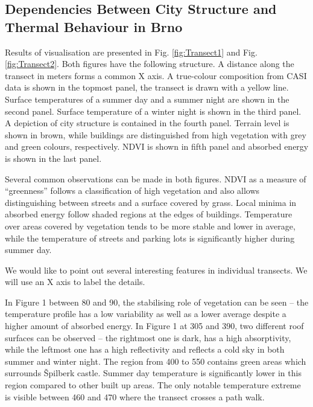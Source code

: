 \begin{appendices}

\chapter{Dependencies Between City Structure and Thermal Behaviour in Brno}
\label{app:Visualisation}

Results of visualisation are presented in Fig. \ref{fig:Transect1} and Fig. \ref{fig:Transect2}. Both figures have the following structure. A distance along the transect in meters forms a common X axis. A true-colour composition from CASI data is shown in the topmost panel, the transect is drawn with a yellow line. Surface temperatures of a summer day and a summer night are shown in the second panel. Surface temperature of a winter night is shown in the third panel. A depiction of city structure is contained in the fourth panel. Terrain level is shown in brown, while buildings are distinguished from high vegetation with grey and green colours, respectively. NDVI is shown in fifth panel and absorbed energy is shown in the last panel.

Several common observations can be made in both figures. NDVI as a measure of “greenness” follows a classification of high vegetation and also allows distinguishing between streets and a surface covered by grass. Local minima in absorbed energy follow shaded regions at the edges of buildings. Temperature over areas covered by vegetation tends to be more stable and lower in average, while the temperature of streets and parking lots is significantly higher during summer day.

We would like to point out several interesting features in individual transects. We will use an X axis to label the details.

In Figure 1 between 80 and 90, the stabilising role of vegetation can be seen – the temperature profile has a low variability as well as a lower average despite a higher amount of absorbed energy. In Figure 1 at 305 and 390, two different roof surfaces can be observed – the rightmost one is dark, has a high absorptivity, while the leftmost one has a high reflectivity and reflects a cold sky in both summer and winter night. The region from 400 to 550 contains green areas which surrounds Špilberk castle. Summer day temperature is significantly lower in this region compared to other built up areas. The only notable temperature extreme is visible between 460 and 470 where the transect crosses a path walk.


\end{appendices}
